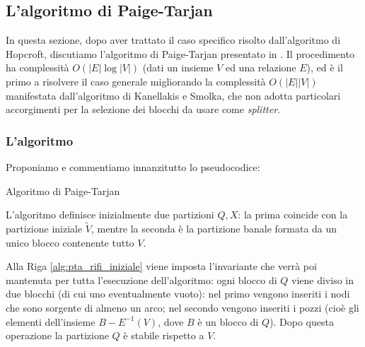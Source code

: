 \newpage
\subsection{L'algoritmo di Paige-Tarjan}
In questa sezione, dopo aver trattato il caso specifico risolto dall'algoritmo di Hopcroft, discutiamo l'algoritmo di Paige-Tarjan presentato in \cite{paigetarjan}. Il procedimento ha complessità $O(|E|\log |V|)$ (dati un insieme $V$ ed una relazione $E$), ed è il primo a risolvere il caso generale migliorando la complessità $O(|E||V|)$ manifestata dall'algoritmo di Kanellakis e Smolka, che non adotta particolari accorgimenti per la selezione dei blocchi da usare come \emph{splitter}.

\subsubsection{L'algoritmo}
Proponiamo e commentiamo innanzitutto lo pseudocodice:\\
\begin{algorithm}[H]
    \label{alg:pt}
    \caption{Algoritmo di Paige-Tarjan}
\end{algorithm}

L'algoritmo definisce inizialmente due partizioni $Q,X$: la prima coincide con la partizione iniziale $\widetilde{V}$, mentre la seconda è la partizione banale formata da un unico blocco contenente tutto $V$.

Alla Riga \ref{alg:pta_rifi_iniziale} viene imposta l'invariante che verrà poi mantenuta per tutta l'esecuzione dell'algoritmo: ogni blocco di $Q$ viene diviso in due blocchi (di cui uno eventualmente vuoto): nel primo vengono inseriti i nodi che sono sorgente di almeno un arco; nel secondo vengono inseriti i pozzi (cioè gli elementi dell'insieme $B - E^{-1}(V)$, dove $B$ è un blocco di $Q$). Dopo questa operazione la partizione $Q$ è stabile rispetto a $V$.

